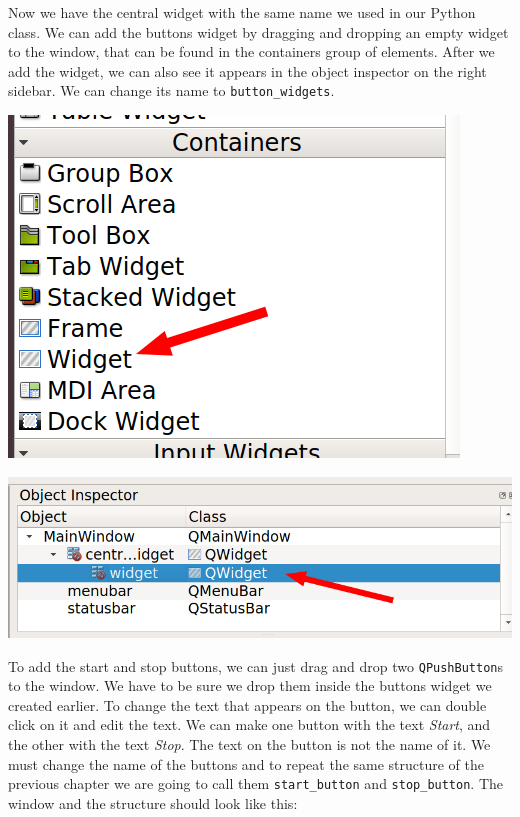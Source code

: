 Now we have the central widget with the same name we used in our Python class. We can add the buttons widget by dragging and dropping an empty widget to the window, that can be found in the containers group of elements. After we add the widget, we can also see it appears in the object inspector on the right sidebar. We can change its name to \texttt{button\_widgets}.

\begin{minipage}{0.45\linewidth}
    \centering
    \includegraphics[width=\textwidth]{images/Chapter_09/04_empty_widget.png}
\end{minipage}
\hspace{0.5cm}
\begin{minipage}{0.45\linewidth}
    \centering
    \includegraphics[width=\textwidth]{images/Chapter_09/04_empty_widget_structure.png}
\end{minipage}

To add the start and stop buttons, we can just drag and drop two \texttt{QPushButton}s to the window. We have to be sure we drop them inside the buttons widget we created earlier. To change the text that appears on the button, we can double click on it and edit the text. We can make one button with the text \emph{Start}, and the other with the text \emph{Stop}. The text on the button is not the name of it. We must change the name of the buttons and to repeat the same structure of the previous chapter we are going to call them \texttt{start\_button} and \texttt{stop\_button}. The window and the structure should look like this:

